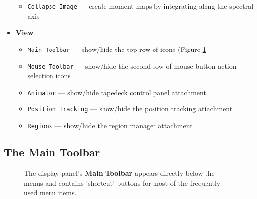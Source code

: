 \begin{itemize}
\begin{itemize}
       \item {\tt Collapse Image} --- create moment maps by integrating along the spectral axis
  \end{itemize}
\item {\bf View}
  \begin{itemize}
      \item {\tt Main Toolbar} --- show/hide the top row of icons (Figure \ref{fig:viewer_maintoolbar}
      \item {\tt Mouse Toolbar} --- show/hide the second row of mouse-button action selection icons
      \item {\tt Animator} --- show/hide tapedeck control panel attachment
      \item {\tt Position Tracking} --- show/hide the position tracking attachment 
      \item {\tt Regions} --- show/hide the region manager attachment
  \end{itemize}
\end{itemize}

\subsection{The Main Toolbar}

\begin{figure}[h!]
\begin{center}
\caption{\label{fig:viewer_maintoolbar} The display panel's
{\bf Main Toolbar} appears directly below the menus and contains
'shortcut' buttons for most of the frequently-used menu items.}
\hrulefill
\end{center}
\end{figure}

